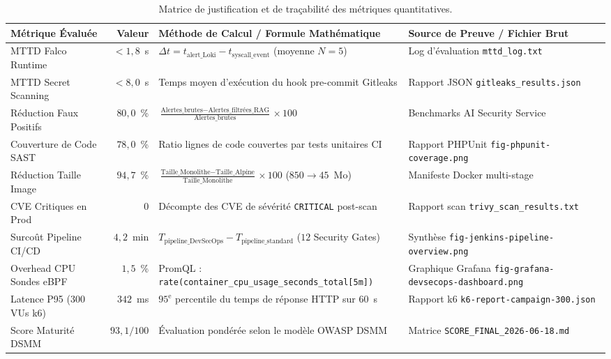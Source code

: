 \begin{table}[H]
\centering
\scriptsize
\begin{tabular}{@{}p{3.2cm}r p{5.0cm} p{4.5cm}@{}}
\toprule
\textbf{Métrique Évaluée} & \textbf{Valeur} & \textbf{Méthode de Calcul / Formule Mathématique} & \textbf{Source de Preuve / Fichier Brut} \\
\midrule
MTTD Falco Runtime & $< 1{,}8$~s & $\Delta t = t_{\text{alert\_Loki}} - t_{\text{syscall\_event}}$ (moyenne $N=5$) & Log d'évaluation \texttt{mttd\_log.txt} \\
MTTD Secret Scanning & $< 8{,}0$~s & Temps moyen d'exécution du hook pre-commit Gitleaks & Rapport JSON \texttt{gitleaks\_results.json} \\
Réduction Faux Positifs & $80{,}0$~\% & $\frac{\text{Alertes\_brutes} - \text{Alertes\_filtrées\_RAG}}{\text{Alertes\_brutes}} \times 100$ & Benchmarks AI Security Service \\
Couverture de Code SAST & $78{,}0$~\% & Ratio lignes de code couvertes par tests unitaires CI & Rapport PHPUnit \texttt{fig-phpunit-coverage.png} \\
Réduction Taille Image & $94{,}7$~\% & $\frac{\text{Taille\_Monolithe} - \text{Taille\_Alpine}}{\text{Taille\_Monolithe}} \times 100$ ($850 \rightarrow 45$~Mo) & Manifeste Docker multi-stage \\
CVE Critiques en Prod & $0$ & Décompte des CVE de sévérité \texttt{CRITICAL} post-scan & Rapport scan \texttt{trivy\_scan\_results.txt} \\
Surcoût Pipeline CI/CD & $4{,}2$~min & $T_{\text{pipeline\_DevSecOps}} - T_{\text{pipeline\_standard}}$ ($12$ Security Gates) & Synthèse \texttt{fig-jenkins-pipeline-overview.png} \\
Overhead CPU Sondes eBPF & $1{,}5$~\% & PromQL : \texttt{rate(container\_cpu\_usage\_seconds\_total[5m])} & Graphique Grafana \texttt{fig-grafana-devsecops-dashboard.png} \\
Latence P95 (300 VUs k6) & $342$~ms & $95^{\text{e}}$ percentile du temps de réponse HTTP sur $60$~s & Rapport k6 \texttt{k6-report-campaign-300.json} \\
Score Maturité DSMM & $93{,}1 / 100$ & Évaluation pondérée selon le modèle OWASP DSMM & Matrice \texttt{SCORE\_FINAL\_2026-06-18.md} \\
\bottomrule
\end{tabular}
\caption{Matrice de justification et de traçabilité des métriques quantitatives.}
\label{tab:justification_metriques_full}
\end{table}


